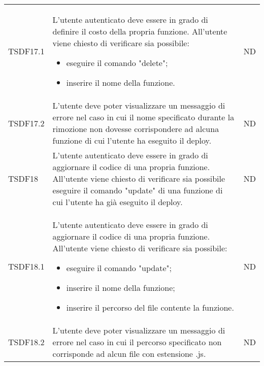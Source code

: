 \begin{longtable}{|C{2cm}|C{8cm}|C{2cm}|}
	TSDF17.1  &
	L'utente autenticato deve essere in grado di definire il costo della propria funzione. All’utente viene chiesto di verificare sia possibile:
	\begin{itemize}
		\item eseguire il comando "delete";
		\item inserire il nome della funzione.
	\end{itemize} &
	ND \\

	TSDF17.2  &
	L’utente deve poter visualizzare un messaggio di errore nel caso in cui il nome specificato durante la rimozione non dovesse corrispondere ad alcuna funzione di cui l'utente ha eseguito il deploy. &
	ND \\
	
	TSDF18  &
	L'utente autenticato deve essere in grado di aggiornare il codice di una propria funzione. All’utente viene chiesto di verificare sia possibile eseguire il comando "update" di una funzione di cui l'utente ha già eseguito il deploy. &
	ND \\
	
	TSDF18.1  &
	L'utente autenticato deve essere in grado di aggiornare il codice di una propria funzione. All’utente viene chiesto di verificare sia possibile:
	\begin{itemize}
		\item eseguire il comando "update";
		\item inserire il nome della funzione;
		\item inserire il percorso del file contente la funzione.
	\end{itemize} &
	ND \\
	
	TSDF18.2  &
	L’utente deve poter visualizzare un messaggio di errore nel caso in cui il percorso specificato non corrisponde ad alcun file con estensione .js. &
	ND \\
\end{longtable}